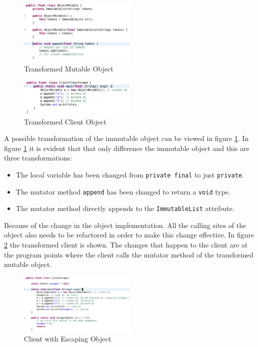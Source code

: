 \begin{figure}[H]
	\caption{Transformed Mutable Object} \label{fig:mutableobj}
	\includegraphics[width=0.5\textwidth]{img/mutable_object}
\end{figure}

\begin{figure}[H]
	\caption{Transformed Client Object} \label{fig:transformedclient}
	\includegraphics[width=0.5\textwidth]{img/client_transformed}
\end{figure}

A possible transformation of the immutable object can be viewed in figure \ref{fig:mutableobj}. In figure \ref{fig:mutableobj} it is evident that that only difference the immutable object and this are three transformations:
\begin{itemize}
\item The local variable has been changed from \texttt{private final} to just \texttt{private}.
\item The mutator method \texttt{append} has been changed to return a \texttt{void} type.
\item The mutator method directly appends to the \texttt{ImmutableList} attribute.
\end{itemize}

Because of the change in the object implementation. All the calling sites of the object also needs to be refactored in order to make this change effective. In figure \ref{fig:transformedclient} the transformed client is shown. The changes that happen to the client are at the program points where the client calls the mutator method of the transformed mutable object.

\begin{figure}[H]
	\caption{Client with Escaping Object} \label{fig:client_escape}
	\includegraphics[width=0.5\textwidth]{img/client_escape}
\end{figure}

